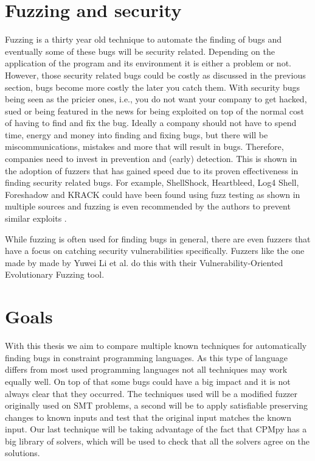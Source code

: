 \section{Fuzzing and security}
\label{intro:FussingSecurity}
Fuzzing is a thirty year old technique to automate the finding of bugs and eventually some of these bugs will be security related. Depending on the application of the program and its environment it is either a problem or not. However, those security related bugs could be costly as discussed in the previous section, bugs become more costly the later you 
catch them. With security bugs being seen as the pricier ones, i.e., you do not want your company to get hacked, sued or being featured in the news for being exploited on top of the normal cost of having to find and fix the bug. %
Ideally a company should not have to spend time, energy and money into finding and fixing bugs, but there will be miscommunications, mistakes and more that will result in bugs. Therefore, companies need to invest in prevention and (early) detection. This is shown in the adoption of fuzzers that has gained speed due to its proven effectiveness in finding security related bugs. For example, ShellShock, Heartbleed, Log4 Shell, Foreshadow and KRACK could have been found using fuzz testing as shown in multiple sources \cite{HeartbleedViaFuzzing, 34ForeshadowViaFuzz, ShellShockViaFuzzing, Log4ShellViaFuzzing} and fuzzing is even recommended by the authors to prevent similar exploits \cite{35ForeshadowFuzzRecom, 33KrackViaFuzz}.

While fuzzing is often used for finding bugs in general, there are even fuzzers that have a focus on catching security vulnerabilities specifically. Fuzzers like the one made by made by Yuwei Li et al. \cite{32V-Fuzz} do this with their Vulnerability-Oriented Evolutionary Fuzzing tool.

\section{Goals}
\label{intro:Goals}
With this thesis we aim to compare multiple known techniques for automatically finding bugs in constraint programming languages. As this type of language differs from most used programming languages not all techniques may work equally well. On top of that some bugs could have a big impact and it is not always clear that they occurred.
The techniques used will be a modified fuzzer originally used on SMT problems, a second will be to apply satisfiable preserving changes to known inputs and test that the original input matches the known input. Our last technique will be taking advantage of the fact that CPMpy has a big library of solvers, which will be used to check that all the solvers agree on the solutions.

